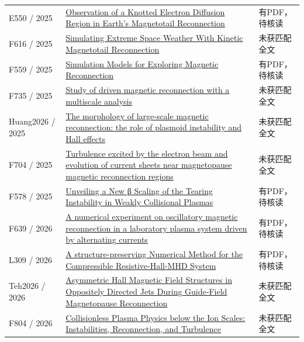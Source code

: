 \begin{longtable}{P{24mm}P{97mm}P{27mm}}
E550 / 2025 & \href{https://doi.org/10.1029/2025gl117612}{Observation of a Knotted Electron Diffusion Region in Earth's Magnetotail Reconnection} & 有PDF，待核读\\

F616 / 2025 & \href{https://doi.org/10.1029/2024sw004057}{Simulating Extreme Space Weather With Kinetic Magnetotail Reconnection} & 未获匹配全文\\

F559 / 2025 & \href{https://doi.org/10.1007/s11214-025-01210-5}{Simulation Models for Exploring Magnetic Reconnection} & 有PDF，待核读\\

F735 / 2025 & \href{https://doi.org/10.1080/10420150.2025.2475389}{Study of driven magnetic reconnection with a multiscale analysis} & 未获匹配全文\\

Huang2026 / 2025 & \href{https://doi.org/10.1080/10420150.2025.2598789}{The morphology of large-scale magnetic reconnection: the role of plasmoid instability and Hall effects} & 未获匹配全文\\

F704 / 2025 & \href{https://doi.org/10.1088/1361-6587/adfe19}{Turbulence excited by the electron beam and evolution of current sheets near magnetopause magnetic reconnection regions} & 未获匹配全文\\

F578 / 2025 & \href{https://doi.org/10.3847/1538-4357/ae046e}{Unveiling a New β Scaling of the Tearing Instability in Weakly Collisional Plasmas} & 有PDF，待核读\\

F639 / 2026 & \href{https://doi.org/10.1063/5.0323293}{A numerical experiment on oscillatory magnetic reconnection in a laboratory plasma system driven by alternating currents} & 有PDF，待核读\\

L309 / 2026 & \href{https://arxiv.org/abs/2607.14286}{A structure-preserving Numerical Method for the Compressible Resistive-Hall-MHD System} & 有PDF，待核读\\

Teh2026 / 2026 & \href{https://doi.org/10.1029/2026ja035335}{Asymmetric Hall Magnetic Field Structures in Oppositely Directed Jets During Guide‐Field Magnetopause Reconnection} & 未获匹配全文\\

F804 / 2026 & \href{https://dspace.mit.edu/handle/1721.1/169938}{Collisionless Plasma Physics below the Ion Scales: Instabilities,  Reconnection,  and Turbulence} & 未获匹配全文\\


\end{longtable}
